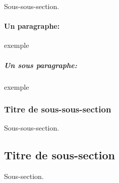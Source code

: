     Sous-sous-section.
    
    \paragraph{Un paragraphe:} exemple
    
    \subparagraph{Un sous paragraphe:} exemple
    
    \subsubsection{Titre de sous-sous-section}

    Sous-sous-section.
    
    \subsection{Titre de sous-section}
    
    Sous-section.
